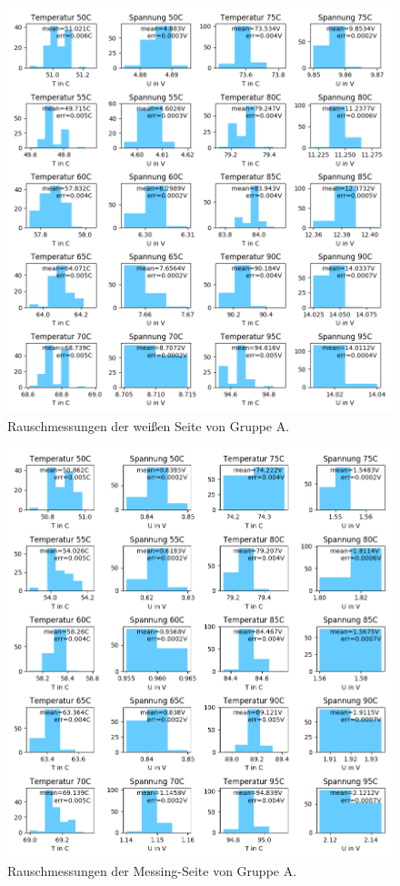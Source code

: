 \documentclass[12pt,a4paper]{article}
\begin{document}
\begin{figure}[H]
\includegraphics[scale=0.8]{Bilder/Rauschen_B_weiss_2.png}
\caption{Rauschmessungen der weißen Seite von Gruppe A.}
\end{figure}

\begin{figure}[H]
\includegraphics[scale=0.8]{Bilder/Rauschen_B_messing_2.png}
\caption{Rauschmessungen der Messing-Seite von Gruppe A.}
\end{figure}
\end{document}
